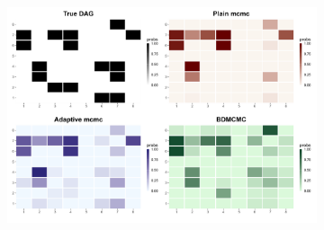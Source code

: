 \documentclass{report}
\begin{document}
\begin{figure}[!ht]
{\begin{minipage}{\textwidth}
\begin{subfigure}[b]{0.45\textwidth}
				\label{fig:heatmaps-100}
			\end{subfigure}
			\hspace{0.35cm}
			\begin{subfigure}[b]{0.45\textwidth}   
				\centering
				\includegraphics[width=\textwidth, height=12cm]{Figures/Overall_comparison/Random_dags/heat_dag_1_n_1000.png}
				\label{fig:heatmaps-100}
			\end{subfigure}
			
			\vspace{0.4cm}   %
			

\end{minipage}}
\end{figure}
\end{document}
